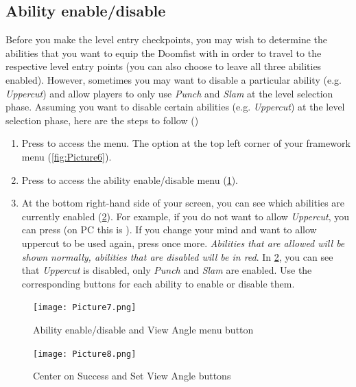 \documentclass[12pt,a4paper]{article}
\begin{document}
    \subsection{Ability enable/disable}
        Before you make the level entry checkpoints, you may wish to determine the abilities that 
        you want to equip the Doomfist with in order to travel to the respective level entry points (you
        can also choose to leave all three abilities enabled). However, sometimes you may want to 
        disable a particular ability (e.g. \emph{Uppercut}) and allow players to only use \emph{Punch} and \emph{Slam} at 
        the level selection phase.
        Assuming you want to disable certain abilities (e.g. \emph{Uppercut}) at the level selection phase, here 
        are the steps to follow ()
        \begin{enumerate}
          \item Press  to access the menu. The option at the top left corner of 
                your framework menu (\cref{fig:Picture6}).
          \item Press  to access the ability enable/disable menu (\cref{fig:Picture7}).
          \item At the bottom right-hand side of your screen, you can see which abilities are currently 
                enabled (\cref{fig:Picture8}). For example, if you do not want to allow \emph{Uppercut}, you can 
                press  (on PC this is ). If you change your mind and want to allow uppercut to be used again, 
                press  once more. \emph{Abilities that are allowed will be shown normally, abilities that 
                are disabled will be in red}. In \cref{fig:Picture8}, you can see that \emph{Uppercut} is disabled, only 
                \emph{Punch} and \emph{Slam} are enabled. Use the corresponding buttons for each ability to enable or disable them. 

        \end{enumerate}
    
    \begin{figure}[ht]
        \centering
        \texttt{[image: Picture7.png]}
        \caption{Ability enable/disable and View Angle menu button}
        \label{fig:Picture7}
    \end{figure}

    \begin{figure}[ht]
        \centering
        \texttt{[image: Picture8.png]}
        \caption{Center on Success and Set View Angle buttons}
        \label{fig:Picture8}
    \end{figure}
    \clearpage
    
\end{document}
